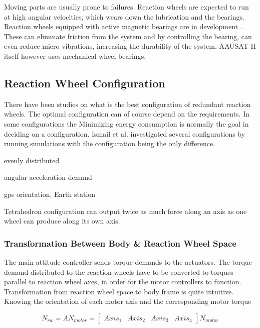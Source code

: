 Moving parts are usually prone to failures. Reaction wheels are expected to run at high angular velocities, which wears down the lubrication and the bearings. Reaction wheels equipped with active magnetic bearings are in development \cite{MagneticReactWheel}. These can eliminate friction from the system and by controlling the bearing, can even reduce micro-vibrations, increasing the durability of the system. AAUSAT-II itself however uses mechanical wheel bearings.

\subsection{Reaction Wheel Configuration}

There have been studies on what is the best configuration of redundant reaction wheels. The optimal configuration can of course depend on the requirements. In some configurations the   Minimizing energy consumption is normally the goal in deciding on a configuration. Ismail et al. \cite{ReactionWheelConfigSim} investigated several configurations by running simulations with the configuration being the only difference.

evenly distributed

angular acceleration demand \cite{ReactionWheelConfigSim} \cite{reactionWheelConfigThesis}

gps orientation, Earth station

Tetrahedron configuration can output twice as much force along an axis as one wheel can produce along its own axis.

\subsubsection{Transformation Between Body \& Reaction Wheel Space}

The main attitude controller sends torque demands to the actuators. The torque demand distributed to the reaction wheels have to be converted to torques parallel to reaction wheel axes, in order for the motor controllers to function. Transformation from reaction wheel space to body frame is quite intuitive. Knowing the orientation of each motor axis and the corresponding motor torque

\begin{equation}
N_{rw} = A N_{motor} = \begin{bmatrix}
Axis_{1}       & Axis_{2}  & Axis_{3}  & Axis_{4} 
\end{bmatrix} N_{motor}
\end{equation}

